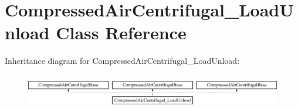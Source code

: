 \hypertarget{class_compressed_air_centrifugal___load_unload}{}\section{Compressed\+Air\+Centrifugal\+\_\+\+Load\+Unload Class Reference}
\label{class_compressed_air_centrifugal___load_unload}
Inheritance diagram for Compressed\+Air\+Centrifugal\+\_\+\+Load\+Unload\+:\begin{figure}[H]
\begin{center}
\leavevmode
\includegraphics[height=1.536351cm]{db/de0/class_compressed_air_centrifugal___load_unload}
\end{center}
\end{figure}
